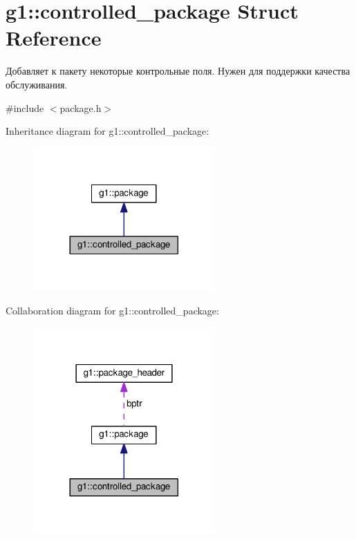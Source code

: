 \hypertarget{structg1_1_1controlled__package}{}\section{g1\+:\+:controlled\+\_\+package Struct Reference}
\label{structg1_1_1controlled__package}


Добавляет к пакету некоторые контрольные поля. Нужен для поддержки качества обслуживания.  




{\ttfamily \#include $<$package.\+h$>$}



Inheritance diagram for g1\+:\+:controlled\+\_\+package\+:
\nopagebreak
\begin{figure}[H]
\begin{center}
\leavevmode
\includegraphics[width=197pt]{structg1_1_1controlled__package__inherit__graph}
\end{center}
\end{figure}


Collaboration diagram for g1\+:\+:controlled\+\_\+package\+:
\nopagebreak
\begin{figure}[H]
\begin{center}
\leavevmode
\includegraphics[width=197pt]{structg1_1_1controlled__package__coll__graph}
\end{center}
\end{figure}

